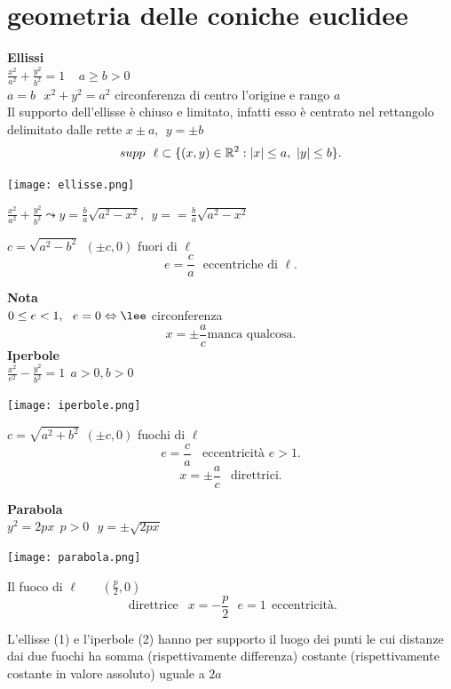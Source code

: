 \documentclass[12px]{article}
\begin{document}
\section{geometria delle coniche euclidee}
\textbf{Ellissi}\\
$\displaystyle \frac{x^2}{a^2} + \frac {y^2}{b^2}=1 \ \ \ \ \ a\geq b>0$\\
 $a = b \ \ \ x^2 + y^2 = a^2$ circonferenza di centro l'origine e rango $a$ \\
 Il  supporto dell'ellisse è chiuso e limitato, infatti esso è centrato nel rettangolo delimitato dalle rette $x\pm a, \ \ y=\pm b$
  \[
	  supp \ \ \ell \subset \{ (x,y)\in\mathbb{R}^2 : |x|\leq a , \ |y| \leq b\}
 .\] 
\begin{center}
	\texttt{[image: ellisse.png]}
\end{center}
  $\displaystyle\frac {x^2}{a^2} + \frac{y^2}{b^2} \leadsto y=\frac b a \sqrt{a^2-x^2}, \ \ y = =\frac b a \sqrt{a^2-x^2}$ \\
  \begin{defi}
	  $c = \sqrt{a^2-b^2} \ \ (\pm c, 0) $ fuori di $\ell$
	   \[
		   e = \frac c a \ \ \ \text{eccentriche di }\ell
	  .\] 
  \end{defi}
  \textbf{Nota}\\
  $0 \leq e < 1, \ \ e = 0 \Leftrightarrow\lee$ circonferenza
  \[
	  x =\pm \frac a c  \text{manca qualcosa}
  .\] 
  \textbf{Iperbole}\\
  $\displaystyle\frac {x^2}{e^2} - \frac{y^2}{b^2} = 1 \ \ a > 0, b > 0$\\
\begin{center}
	\texttt{[image: iperbole.png]}
\end{center}
  \begin{defi}
	  $c = \sqrt{a^2 + b^2} \ \ (\pm c,0)$ fuochi di $\ell$ 
	   \[
		   e = \frac c a \ \ \ \ \text{eccentricità } e>1
	  .\] 
	  \[
		  x = \pm \frac a c \ \ \text{ direttrici}
	  .\] 
  \end{defi}
  \textbf{Parabola}\\
  $y^2 = 2 px \ \ p>0\ \ \ y = \pm\sqrt{2px}$\\
\begin{center}
	\texttt{[image: parabola.png]}
\end{center}
\begin{defi}
	Il fuoco di $\ell$ \ \ \ $(\frac p 2 , 0)$
	 \[
		 \text{ direttrice } \ \ x = -\frac  p 2 \ \ \ e = 1 \ \ \text{eccentricità}
	.\] 
\end{defi}
\begin{prop}
	L'ellisse (1) e l'iperbole (2) hanno per supporto il luogo dei punti le cui distanze dai due fuochi ha somma (rispettivamente differenza) costante (rispettivamente costante in valore assoluto) uguale a $2a$
\end{prop}
\end{document}
